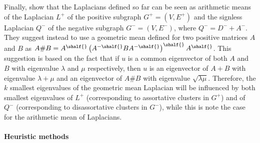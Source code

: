 Finally, \textcite{mGeometricMean16} show that the Laplacians defined so far can be seen as
arithmetic means of the Laplacian $L^+$ of the positive subgraph $G^+=(V, E^+)$ and the signless
Laplacian $Q^-$ of the negative subgraph $G^-=(V, E^-)$, where $Q^- = D^- + A^-$. They suggest
instead to use a geometric mean defined for two positive matrices $A$ and $B$ as $A\#B =
A^{\shalf{}} \left(A^{-\shalf{}} BA^{-\shalf{}} \right)^{\shalf{}} A^{\shalf{}}$. This suggestion is
based on the fact that if $u$ is a common eigenvector of both $A$ and $B$ with eigenvalue $\lambda$
and $\mu$ respectively, then $u$ is an eigenvector of $A+B$ with eigenvalue $\lambda+\mu$ and an
eigenvector of $A\#B$ with eigenvalue $\sqrt{\lambda\mu}$. Therefore, the $k$ smallest eigenvalues
of the geometric mean Laplacian will be influenced by both smallest eigenvalues of $L^+$
(corresponding to assortative clusters in $G^+$) and of $Q^-$ (corresponding to disassortative
clusters in $G^-$), while this is note the case for the arithmetic mean of Laplacians.

\paragraph{Heuristic methods}

